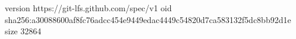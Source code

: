 version https://git-lfs.github.com/spec/v1
oid sha256:a30088600af8fc76adcc454e9449edac4449c54820d7ca583132f5dc8bb92d1e
size 32864
